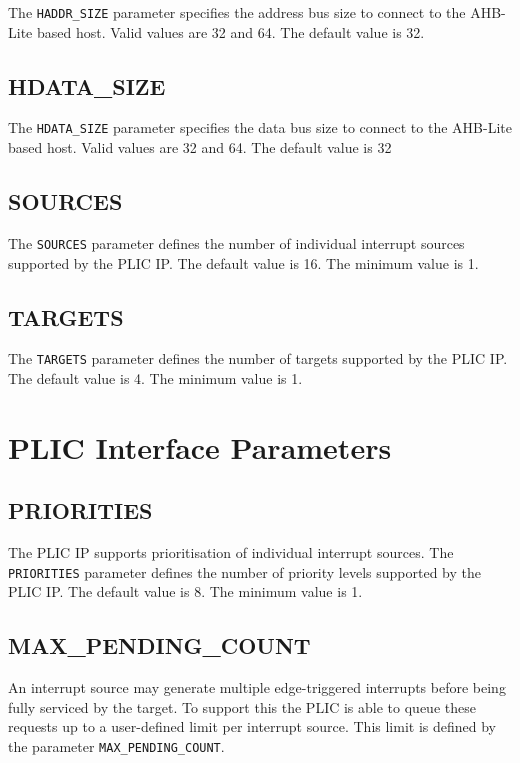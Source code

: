 The \texttt{HADDR\_SIZE} parameter specifies the address bus size to connect to the AHB-Lite based host. Valid values are 32 and 64. The default value is 32.

\subsection{HDATA\_SIZE}

The \texttt{HDATA\_SIZE} parameter specifies the data bus size to connect to the AHB-Lite based host. Valid values are 32 and 64. The default value is 32

\hypertarget{SOURCES}{\subsection{SOURCES}\label{sec:SOURCES}}

The \texttt{SOURCES} parameter defines the number of individual
interrupt sources supported by the PLIC IP. The default value is 16. The
minimum value is 1.

\hypertarget{TARGETS}{\subsection{TARGETS}\label{sec:TARGETS}}

The \texttt{TARGETS} parameter defines the number of targets supported
by the PLIC IP. The default value is 4. The minimum value is 1.

\pagebreak

\section{PLIC Interface Parameters}

\subsection{PRIORITIES}

The PLIC IP supports prioritisation of individual interrupt sources. The \texttt{PRIORITIES} parameter defines the number of priority levels supported by the PLIC IP. The default value is 8. The minimum value is 1.

\subsection{MAX\_PENDING\_COUNT}

An interrupt source may generate multiple edge-triggered interrupts before being fully serviced by the target. To support this the PLIC is able to queue these requests up to a user-defined limit per interrupt source. This limit is defined by the parameter \texttt{MAX\_PENDING\_COUNT}.

